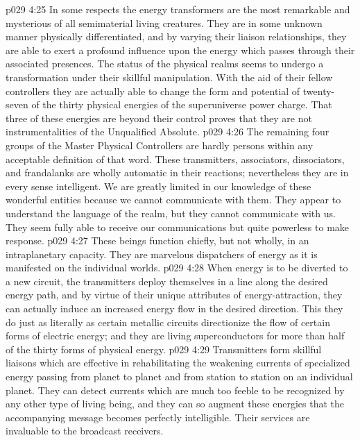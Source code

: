 \vs p029 4:25 In some respects the energy transformers are the most remarkable and mysterious of all semimaterial living creatures. They are in some unknown manner physically differentiated, and by varying their liaison relationships, they are able to exert a profound influence upon the energy which passes through their associated presences. The status of the physical realms seems to undergo a transformation under their skillful manipulation.  With the aid of their fellow controllers they are actually able to change the form and potential of twenty\hyp{}seven of the thirty physical energies of the superuniverse power charge. That three of these energies are beyond their control proves that they are not instrumentalities of the Unqualified Absolute.
\pc \vs p029 4:26 The remaining four groups of the Master Physical Controllers are hardly persons within any acceptable definition of that word. These transmitters, associators, dissociators, and frandalanks are wholly automatic in their reactions; nevertheless they are in every sense intelligent. We are greatly limited in our knowledge of these wonderful entities because we cannot communicate with them. They appear to understand the language of the realm, but they cannot communicate with us. They seem fully able to receive our communications but quite powerless to make response.
\pc \vs p029 4:27 \bibnobreakspace {} These beings function chiefly, but not wholly, in an intraplanetary capacity. They are marvelous dispatchers of energy as it is manifested on the individual worlds.
\vs p029 4:28 When energy is to be diverted to a new circuit, the transmitters deploy themselves in a line along the desired energy path, and by virtue of their unique attributes of energy\hyp{}attraction, they can actually induce an increased energy flow in the desired direction. This they do just as literally as certain metallic circuits directionize the flow of certain forms of electric energy; and they are living superconductors for more than half of the thirty forms of physical energy.
\vs p029 4:29 Transmitters form skillful liaisons which are effective in rehabilitating the weakening currents of specialized energy passing from planet to planet and from station to station on an individual planet. They can detect currents which are much too feeble to be recognized by any other type of living being, and they can so augment these energies that the accompanying message becomes perfectly intelligible. Their services are invaluable to the broadcast receivers.
